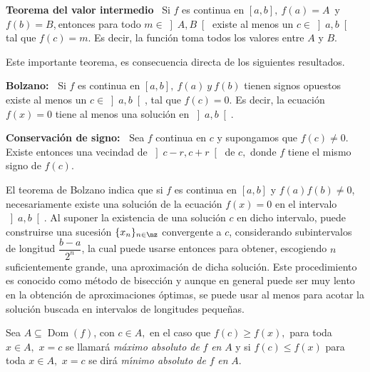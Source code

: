 \begin{theorem} {\bfseries Teorema del valor intermedio}\ %
%
\label{a6} Si $f$ es continua en $[a,b],\ f(a)=A$\ y\ $f(b)=B$,$\ $entonces
para todo $m\in\left]  A,B\right[  $ existe al menos un $c\in\left]
a,b\right[  $ tal que $f(c)=m$. Es decir, la funci\'{o}n toma todos los
valores entre $A$ y $B$.
\end{theorem}

Este importante teorema, es consecuencia directa de los siguientes resultados.

\begin{theorem}
{\bf Bolzano:\ } \label{Bolzano}%
%
Si $f$ es continua en $[a,b],\ f(a)\ y\ f(b)$ tienen signos opuestos existe al
menos un $c\in\left]  a,b\right[  $, tal que $f(c)=0$. Es decir, la
ecuaci\'{o}n $f(x)=0$ tiene al menos una soluci\'{o}n en $\left]  a,b\right[
$.
\end{theorem}

\begin{theorem}
{ \bf Conservaci\'{o}n de signo:\ }%
%
\label{Conservacion}Sea $f$ continua en $c$ y supongamos que $f\left(
c\right)  \neq0.$Existe entonces una vecindad de $\left]  c-r,c+r\right[  $ de
$c,$ donde $f$ tiene el mismo signo de $f\left(  c\right)  .$
\end{theorem}

El teorema de Bolzano
%
indica que si $f$ es continua en $[a,b]$ y $f(a)f(b)\neq0$, necesariamente
existe una soluci\'{o}n de la ecuaci\'{o}n $f(x)=0$ en el intervalo $\left]
a,b\right[  $. Al suponer la existencia de una soluci\'{o}n $c$ en dicho
intervalo, puede construirse una sucesi\'{o}n $\{x_{n}\}_{n\in\nz}$
convergente a $c$, considerando subintervalos de longitud $\dfrac{b-a}{2^{n}}%
$, la cual puede usarse entonces para obtener, escogiendo $n$ suficientemente
grande, una aproximaci\'{o}n de dicha soluci\'{o}n. Este procedimiento es
conocido como m\'{e}todo de bisecci\'{o}n y aunque en general puede ser muy
lento en la obtenci\'{o}n de aproximaciones \'{o}ptimas, se puede usar al
menos para acotar la soluci\'{o}n buscada en intervalos de longitudes peque\~{n}as.

\bigskip

Sea $A\subseteq\operatorname*{Dom}\left(  f\right)  $, con $c\in A,$ en el
caso que $f\left(  c\right)  \geq f\left(  x\right)  ,$ para toda $x\in A,$
$x=c$ se llamar\'{a}
%
%
\textit{m\'{a}ximo absoluto de }$f$\textit{ en }$A$ y si $f\left(  c\right)
\leq f\left(  x\right)  $ para toda $x\in A,$ $x=c$ se dir\'{a}
\textit{m\'{\i}nimo absoluto de }$f$\textit{ en }$A$.%



